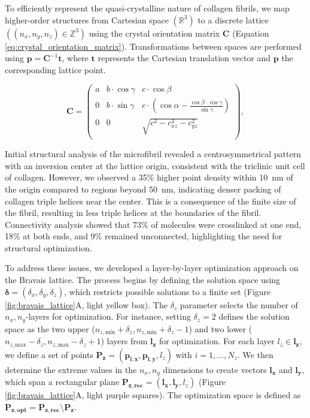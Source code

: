 \documentclass[10pt,letterpaper]{article}
\begin{document}
To efficiently represent the quasi-crystalline nature of collagen fibrils, we map higher-order structures from Cartesian space \((\mathbb{R}^3)\) to a discrete lattice \(((n_x,n_y,n_z)\in\mathbb{Z}^3)\) using the crystal orientation matrix \(\bm{C}\) (Equation \ref{eq:crystal_orientation_matrix}). Transformations between spaces are performed using \(\bm{p} = \bm{C}^{-1} \bm{t}\), where \(\bm{t}\) represents the Cartesian translation vector and \(\bm{p}\) the corresponding lattice point.

\begin{equation}
	\bm{C} =
	\begin{pmatrix}
		a & b\cdot\cos \gamma & c\cdot\cos \beta\\
		0 &  b\cdot\sin \gamma& c\cdot\left(\cos \alpha -\frac{\cos \beta\cdot\cos \gamma}{\sin \gamma}\right) \\
		0 & 0 & \sqrt{c^2 - c_{xz}^2 - c_{yz}^2} \\
	\end{pmatrix}
	,
	\label{eq:crystal_orientation_matrix}
\end{equation}

Initial structural analysis of the microfibril revealed a centrosymmetrical pattern with an inversion center at the lattice origin, consistent with the triclinic unit cell of collagen. However, we observed a 35\% higher point density within \SI{10}{\nano\meter} of the origin compared to regions beyond \SI{50}{\nano\meter}, indicating denser packing of collagen triple helices near the center. This is a consequence of the finite size of the fibril, resulting in less triple helices at the boundaries of the fibril. Connectivity analysis showed that 73\% of molecules were crosslinked at one end, 18\% at both ends, and 9\% remained unconnected, highlighting the need for structural optimization.

To address these issues, we developed a layer-by-layer optimization approach on the Bravais lattice. The process begins by defining the solution space using \(\bm{\delta} = (\delta_x,\delta_y,\delta_z)\), which restricts possible solutions to a finite set (Figure \ref{fig:bravais_lattice}A, light yellow box). The \(\delta_z\) parameter selects the number of \(n_x,n_y\)-layers for optimization. For instance, setting \(\delta_z = 2\) defines the solution space as the two upper (\( n_{z,\text{min}}+\delta_z, n_{z,\text{min}}+\delta_z-1 \)) and two lower (\({n_{z,\text{max}}-\delta_z, n_{z,\text{max}}-\delta_z+1}\)) layers from \(\bm{l_z}\) for optimization. For each layer \(l_z \in \bm{l_z}\), we define a set of points \(\bm{P_z} = (\bm{p_{i,x}},\bm{p_{i,y}},l_z)\) with \(i = 1, ..., N_z\). We then determine the extreme values in the \(n_x,n_y\) dimensions to create vectors \(\bm{l_x}\) and \(\bm{l_y}\), which span a rectangular plane \(\bm{P_{z,\text{rec}}} = (\bm{l_x}, \bm{l_y}, l_z)\) (Figure \ref{fig:bravais_lattice}A, light purple squares). The optimization space is defined as \(\bm{P_{z,\text{opt}}} = \bm{P_{z,\text{rec}}} \setminus \bm{P_z}\).
\end{document}
